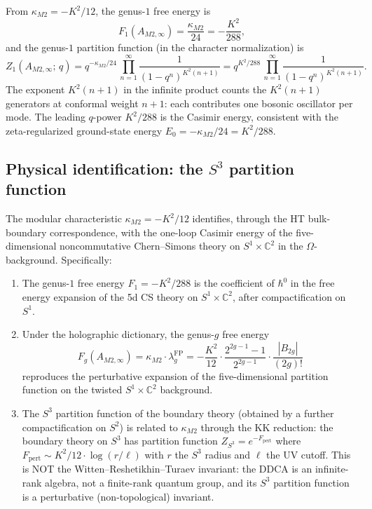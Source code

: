 \documentclass[11pt]{article}
\newcommand{\C}{\mathbb{C}}
\begin{document}
From $\kappa_{M2} = -K^2/12$, the genus-$1$ free energy is
\begin{equation}\label{eq:m2-F1}
F_1(A_{M2,\infty})
= \frac{\kappa_{M2}}{24}
= -\frac{K^2}{288},
\end{equation}
and the genus-$1$ partition function (in the character
normalization) is
\begin{equation}\label{eq:m2-Z1}
Z_1(A_{M2,\infty};\, q)
= q^{-\kappa_{M2}/24}\, \prod_{n=1}^{\infty}
\frac{1}{(1-q^n)^{K^2(n+1)}}
= q^{K^2/288}\, \prod_{n=1}^{\infty}
\frac{1}{(1-q^n)^{K^2(n+1)}}.
\end{equation}
The exponent $K^2(n+1)$ in the infinite product counts the
$K^2(n+1)$ generators at conformal weight $n+1$: each
contributes one bosonic oscillator per mode.  The leading
$q$-power $K^2/288$ is the Casimir energy, consistent with
the zeta-regularized ground-state energy
$E_0 = -\kappa_{M2}/24 = K^2/288$.

\subsection{Physical identification: the $S^3$ partition function}

\begin{theorem}
\label{thm:kappa-m2-physical}
The modular characteristic $\kappa_{M2} = -K^2/12$ identifies,
through the HT bulk-boundary correspondence, with the one-loop
Casimir energy of the five-dimensional noncommutative
Chern--Simons theory on $S^1 \times \C^2$ in the
$\Omega$-background.  Specifically:
\begin{enumerate}[label=(\roman*)]
\item The genus-$1$ free energy
$F_1 = -K^2/288$ is the coefficient of
$\hbar^0$ in the free energy expansion of the 5d CS theory
on $S^1 \times \C^2$, after compactification on $S^1$.
\item Under the holographic dictionary, the genus-$g$ free
energy
\[
F_g(A_{M2,\infty})
= \kappa_{M2}\cdot \lambda_g^{\mathrm{FP}}
= -\frac{K^2}{12}\cdot
\frac{2^{2g-1}-1}{2^{2g-1}}\cdot
\frac{|B_{2g}|}{(2g)!}
\]
reproduces the perturbative expansion of the
five-dimensional partition function on the twisted
$S^1 \times \C^2$ background.
\item The $S^3$ partition function of the boundary theory
(obtained by a further compactification on $S^2$) is
related to $\kappa_{M2}$ through the KK reduction:
the boundary theory on $S^3$ has partition function
$Z_{S^3} = e^{-F_{\mathrm{pert}}}$ where
$F_{\mathrm{pert}} \sim K^2/12 \cdot \log(r/\ell)$
with $r$ the $S^3$ radius and $\ell$ the UV cutoff.
This is NOT the Witten--Reshetikhin--Turaev invariant:
the DDCA is an infinite-rank algebra, not a finite-rank
quantum group, and its $S^3$ partition function is a
perturbative (non-topological) invariant.
\end{enumerate}
\end{theorem}
\end{document}
